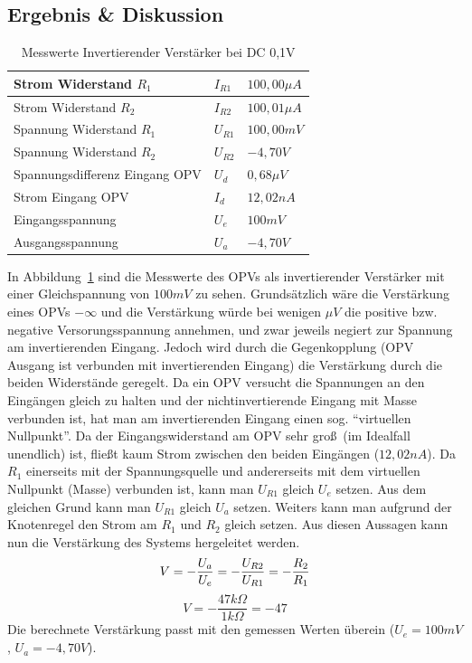 \documentclass[12pt,a4paper,titlepage]{article}
\begin{document}
\subsection{Ergebnis \& Diskussion}
\begin{table}[H]
\centering
\begin{tabular}{|l|l|l|}
\hline
Strom Widerstand $R_1$ & $I_{R1}$ & $100,00\mu A$  \\ \hline
Strom Widerstand $R_2$ & $I_{R2}$ & $100,01\mu A$  \\ \hline
Spannung Widerstand $R_1$ & $U_{R1}$ & $100,00mV$  \\ \hline
Spannung Widerstand $R_2$ & $U_{R2}$ & $-4,70V$ \\ \hline
Spannungsdifferenz Eingang OPV & $U_d$  & $0,68\mu V$      \\ \hline
Strom Eingang OPV & $I_d$  & $12,02nA$ \\ \hline
Eingangsspannung & $U_e$  & $100mV$        \\ \hline
Ausgangsspannung & $U_a$  & $-4,70V$   \\ \hline
\end{tabular}
\caption{Messwerte Invertierender Verst\"arker bei DC 0,1V}
\label{figure12}
\end{table}
\noindent In Abbildung~\ref{figure12} sind die Messwerte des OPVs als invertierender Verst\"arker mit einer Gleichspannung von $100mV$ zu sehen. Grunds\"atzlich w\"are die Verst\"arkung eines OPVs $-\infty$ und die Verst\"arkung w\"urde bei wenigen $\mu V$ die positive bzw. negative Versorungsspannung annehmen, und zwar jeweils negiert zur Spannung am invertierenden Eingang. Jedoch wird durch die Gegenkopplung (OPV Ausgang ist verbunden mit invertierenden Eingang) die Verst\"arkung durch die beiden Widerst\"ande geregelt. Da ein OPV versucht die Spannungen an den Eing\"angen gleich zu halten und der nichtinvertierende Eingang mit Masse verbunden ist, hat man am invertierenden Eingang einen sog. ``virtuellen Nullpunkt''. Da der Eingangswiderstand am OPV sehr gro\ss \, (im Idealfall unendlich) ist, flie\ss t kaum Strom zwischen den beiden Eing\"angen ($12,02nA$). Da $R_1$ einerseits mit der Spannungsquelle und andererseits mit dem virtuellen Nullpunkt (Masse) verbunden ist, kann man $U_{R1}$ gleich $U_e$ setzen. Aus dem gleichen Grund kann man $U_{R1}$ gleich $U_a$ setzen. Weiters kann man aufgrund der Knotenregel den Strom am $R_1$ und $R_2$ gleich setzen. Aus diesen Aussagen kann nun die Verst\"arkung des Systems hergeleitet werden.
\begin{equation*}
  V = -\frac{U_a}{U_e} = -\frac{U_{R2}}{U_{R1}} = -\frac{R_2}{R_1} \\
\end{equation*}
\begin{equation*}
  V = -\frac{47 k\Omega}{1 k\Omega} = -47
\end{equation*}
\noindent Die berechnete Verst\"arkung passt mit den gemessen Werten \"uberein ($U_e = 100mV$, $U_a = -4,70V$).
\end{document}
